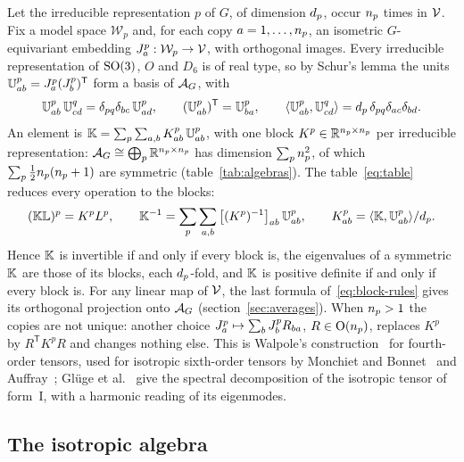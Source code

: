 Let the irreducible representation $p$ of $G$, of dimension $d_{p}$, occur
$n_{p}$ times in $\mathcal{V}$. Fix a model space $\mathcal W_p$ and, for each copy
$a=1,\dots,n_{p}$, an isometric $G$-equivariant embedding $J_{a}^{p}:\mathcal
W_p\to\mathcal{V}$, with orthogonal images. Every irreducible representation of $\mathrm{SO}(3)$, $O$
and $D_6$ is of real type, so by Schur's lemma the units
$\mathbb{U}^{p}_{ab}=J_{a}^{p}(J_{b}^{p})^{\mathsf T}$ form a basis of $\mathcal{A}_{G}$, with
\begin{equation}
\mathbb{U}^{p}_{ab}\,\mathbb{U}^{q}_{cd}=\delta_{pq}\delta_{bc}\,\mathbb{U}^{p}_{ad},\qquad
(\mathbb{U}^{p}_{ab})^{\mathsf T}=\mathbb{U}^{p}_{ba},\qquad
\langle\mathbb{U}^{p}_{ab},\mathbb{U}^{q}_{cd}\rangle=d_{p}\,\delta_{pq}\delta_{ac}\delta_{bd}.
\label{eq:table}
\end{equation}
An element is $\mathbb{K}=\sum_p\sum_{a,b}K^p_{ab}\,\mathbb{U}^{p}_{ab}$, with one block
$K^p\in\mathbb R^{n_{p}\times n_{p}}$ per irreducible representation:
$\mathcal{A}_{G}\cong\bigoplus_p\mathbb R^{n_{p}\times n_{p}}$ has dimension
$\sum_pn_{p}^2$, of which $\sum_p\tfrac12n_{p}(n_{p}+1)$ are symmetric
(table~\ref{tab:algebras}). The table~\eqref{eq:table} reduces every operation to the
blocks:
\begin{equation}
(\mathbb{K}\mathbb L)^p=K^pL^p,\qquad
\mathbb{K}^{-1}=\sum_p\sum_{a,b}\big[(K^p)^{-1}\big]_{ab}\,\mathbb{U}^{p}_{ab},\qquad
K^p_{ab}=\langle\mathbb{K},\mathbb{U}^{p}_{ab}\rangle/d_{p}.\label{eq:block-rules}
\end{equation}
Hence $\mathbb{K}$ is invertible if and only if every block is, the eigenvalues of a symmetric
$\mathbb{K}$ are those of its blocks, each $d_{p}$-fold, and $\mathbb{K}$ is positive definite if
and only if every block is. For any linear map of $\mathcal{V}$, the last formula
of~\eqref{eq:block-rules} gives its orthogonal projection onto $\mathcal{A}_{G}$
(section~\ref{sec:averages}). When $n_{p}>1$ the copies are not unique: another choice
$J_{a}^{p}\mapsto\sum_bJ_{b}^{p}R_{ba}$, $R\in\mathrm O(n_{p})$, replaces $K^p$ by
$R^{\mathsf T}K^pR$ and changes nothing else. This is Walpole's
construction~\cite{Walpole1984} for fourth-order tensors, used for isotropic sixth-order
tensors by Monchiet and Bonnet~\cite{Monchiet2011a} and Auffray~\cite{Auffray2015}; Glüge
et al.~\cite{Gluge2016} give the spectral decomposition of the isotropic tensor of form~I,
with a harmonic reading of its eigenmodes.

\subsection{The isotropic algebra}\label{sec:isotropic}

